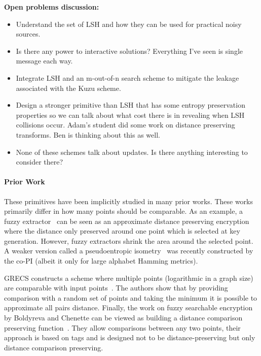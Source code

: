 \textbf{Open problems discussion:} 
\begin{itemize}
\item Understand the set of LSH and how they can be used for practical noisy sources.
\item Is there any power to interactive solutions?  Everything I've seen is single message each way.
\item Integrate LSH and an m-out-of-n search scheme to mitigate the leakage associated with the Kuzu scheme.
\item Design a stronger primitive than LSH that has some entropy preservation properties so we can talk about what cost there is in revealing when LSH collisions occur.  Adam's student did some work on distance preserving transforms.  Ben is thinking about this as well.  
\item None of these schemes talk about updates.  Is there anything interesting to consider there?
\end{itemize}

\paragraph{Prior Work}
These primitives have been implicitly studied in many prior works.  These works primarily differ in how many points should be comparable.  As an example, a fuzzy extractor~\cite{DRS04} can be seen as an approximate distance preserving encryption where the distance only preserved around one point which is selected at key generation.  However, fuzzy extractors shrink the area around the selected point.  A weaker version called a pseudoentropic isometry~\cite{cryptoeprint:2016:1100} was recently constructed by the co-PI (albeit it only for large alphabet Hamming metrics).

GRECS constructs a scheme where multiple points (logarithmic in a graph size) are comparable with input points~\cite{meng2015grecs}.  The authors show that by providing comparison with a random set of points and taking the minimum it is possible to approximate all pairs distance.
Finally, the work on fuzzy searchable encryption by Boldyreva and Chenette can be viewed as building a distance comparison preserving function~\cite{boldyreva2014efficient}.  They allow comparisons between any two points, their approach is based on tags and is designed not to be distance-preserving but only distance comparison preserving.


